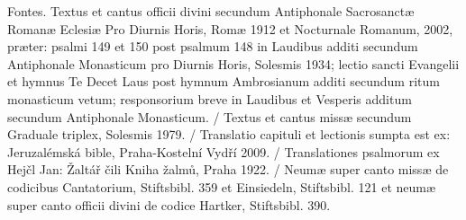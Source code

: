\documentclass[a4paper, twoside, 12pt]{article}
\begin{document}
\vspace{2.6cm}

 


\vfill
\pagebreak


\vfill

 


\vspace{1cm}
 


\vfill
\pagebreak

 




\cantusSineNeumas

%

\vfill
\pagebreak

\newpage
\RemoveSideThumbs
\pagestyle{empty}

\vfill

Fontes.
Textus et cantus officii divini secundum
Antiphonale Sacrosanctæ Romanæ Eclesiæ Pro Diurnis Horis, Romæ 1912
et Nocturnale Romanum, 2002, præter: psalmi 149 et 150 post
psalmum 148 in Laudibus additi secundum Antiphonale Monasticum pro Diurnis Horis,
Solesmis 1934; lectio sancti Evangelii et hymnus Te Decet Laus post hymnum
Ambrosianum additi secundum ritum monasticum vetum; responsorium breve
in Laudibus et Vesperis additum secundum Antiphonale Monasticum. /
Textus et cantus missæ secundum
Graduale triplex, Solesmis 1979. /
Translatio capituli et lectionis sumpta est ex:
Jeruzalémská bible, Praha-Kostelní Vydří 2009. /
Translationes psalmorum ex
Hejčl Jan: Žaltář čili Kniha žalmů, Praha 1922. /
Neumæ super canto missæ de codicibus Cantatorium, Stiftsbibl. 359 et Einsiedeln,
Stiftsbibl. 121 et neumæ super canto officii divini de codice Hartker,
Stiftsbibl. 390.
\end{document}
